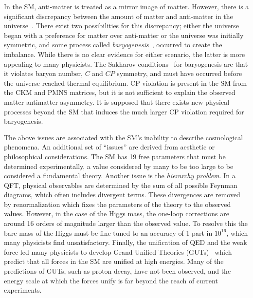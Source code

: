 In the SM, anti-matter is treated as a mirror image of matter.
However, there is a significant discrepancy between the amount of matter and anti-matter in the universe~\cite{AlexDM1, AlexDM2}.
There exist two possibilities for this discrepancy; either the universe began with a preference for matter over anti-matter or the universe was initially symmetric, and some process called \textit{baryogenesis}~\cite{BaryosynthesisOriginGalaxies}, occurred to create the imbalance.
While there is no clear evidence for either scenario, the latter is more appealing to many physicists.
The Sakharov conditions~\cite{Sakharov1967} for baryogenesis are that it violates baryon number, $C$ and $CP$ symmetry, and must have occurred before the universe reached thermal equilibrium.
CP violation is present in the SM from the CKM and PMNS matrices, but it is not sufficient to explain the observed matter-antimatter asymmetry.
It is supposed that there exists new physical processes beyond the SM that induces the much larger CP violation required for baryogenesis.

The above issues are associated with the SM's inability to describe cosmological phenomena.
An additional set of ``issues'' are derived from aesthetic or philosophical considerations.
The SM has 19 free parameters that must be determined experimentally, a value considered by many to be too large to be considered a fundamental theory.
Another issue is the \textit{hierarchy problem}.
In a QFT, physical observables are determined by the sum of all possible Feynman diagrams, which often includes divergent terms.
These divergences are removed by renormalization which fixes the parameters of the theory to the observed values.
However, in the case of the Higgs mass, the one-loop corrections are around 16 orders of magnitude larger than the observed value.
To resolve this the bare mass of the Higgs must be fine-tuned to an accuracy of 1 part in $10^{16}$, which many physicists find unsatisfactory.
Finally, the unification of QED and the weak force led many physicists to develop Grand Unified Theories (GUTs)~\cite{GUT1, GUT2} which predict that all forces in the SM are unified at high energies.
Many of the predictions of GUTs, such as proton decay, have not been observed, and the energy scale at which the forces unify is far beyond the reach of current experiments.
